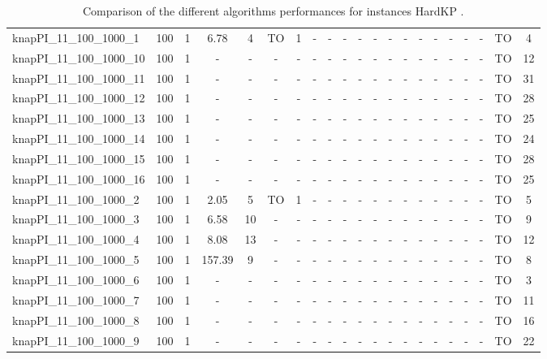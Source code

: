 \begin{sidewaystable}[!ht]
{\begin{tabular}{lcccccccccccccccccccc}
knapPI\_11\_100\_1000\_1 & 100 & 1 &  \textcolor{blue2}{6.78} & 4 & TO & 1 &  - &  - &  - &  - &  - &  - &  - &  - &  - &  - &  - &  - & TO & 4 \\
knapPI\_11\_100\_1000\_10 & 100 & 1 &  - &  - &  - &  - &  - &  - &  - &  - &  - &  - &  - &  - &  - &  - &  - &  - & TO & 12 \\
knapPI\_11\_100\_1000\_11 & 100 & 1 &  - &  - &  - &  - &  - &  - &  - &  - &  - &  - &  - &  - &  - &  - &  - &  - & TO & 31 \\
knapPI\_11\_100\_1000\_12 & 100 & 1 &  - &  - &  - &  - &  - &  - &  - &  - &  - &  - &  - &  - &  - &  - &  - &  - & TO & 28 \\
knapPI\_11\_100\_1000\_13 & 100 & 1 &  - &  - &  - &  - &  - &  - &  - &  - &  - &  - &  - &  - &  - &  - &  - &  - & TO & 25 \\
knapPI\_11\_100\_1000\_14 & 100 & 1 &  - &  - &  - &  - &  - &  - &  - &  - &  - &  - &  - &  - &  - &  - &  - &  - & TO & 24 \\
knapPI\_11\_100\_1000\_15 & 100 & 1 &  - &  - &  - &  - &  - &  - &  - &  - &  - &  - &  - &  - &  - &  - &  - &  - & TO & 28 \\
knapPI\_11\_100\_1000\_16 & 100 & 1 &  - &  - &  - &  - &  - &  - &  - &  - &  - &  - &  - &  - &  - &  - &  - &  - & TO & 25 \\
knapPI\_11\_100\_1000\_2 & 100 & 1 &  \textcolor{blue2}{2.05} & 5 & TO & 1 &  - &  - &  - &  - &  - &  - &  - &  - &  - &  - &  - &  - & TO & 5 \\
knapPI\_11\_100\_1000\_3 & 100 & 1 &  \textcolor{blue2}{6.58} & 10 &  - &  - &  - &  - &  - &  - &  - &  - &  - &  - &  - &  - &  - &  - & TO & 9 \\
knapPI\_11\_100\_1000\_4 & 100 & 1 &  \textcolor{blue2}{8.08} & 13 &  - &  - &  - &  - &  - &  - &  - &  - &  - &  - &  - &  - &  - &  - & TO & 12 \\
knapPI\_11\_100\_1000\_5 & 100 & 1 &  \textcolor{blue2}{157.39} & 9 &  - &  - &  - &  - &  - &  - &  - &  - &  - &  - &  - &  - &  - &  - & TO & 8 \\
knapPI\_11\_100\_1000\_6 & 100 & 1 &  - &  - &  - &  - &  - &  - &  - &  - &  - &  - &  - &  - &  - &  - &  - &  - & TO & 3 \\
knapPI\_11\_100\_1000\_7 & 100 & 1 &  - &  - &  - &  - &  - &  - &  - &  - &  - &  - &  - &  - &  - &  - &  - &  - & TO & 11 \\
knapPI\_11\_100\_1000\_8 & 100 & 1 &  - &  - &  - &  - &  - &  - &  - &  - &  - &  - &  - &  - &  - &  - &  - &  - & TO & 16 \\
knapPI\_11\_100\_1000\_9 & 100 & 1 &  - &  - &  - &  - &  - &  - &  - &  - &  - &  - &  - &  - &  - &  - &  - &  - & TO & 22 \\
\bottomrule
\end{tabular}
}%
\caption{Comparison of the different algorithms performances for instances HardKP .}
\label{tab:table_compare_HardKP }
\end{sidewaystable}
